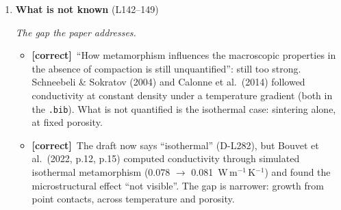 \documentclass[11pt]{article}
\newcommand{\Pg}[3]{\item \textbf{#1} {\small(#2)}\par\textit{#3}}
\newcommand{\tC}{\textcolor{miss}{\textbf{[correct]}}\ }
\newcommand{\tG}{\textcolor{stale}{\textbf{[wording]}}\ }
\newcommand{\add}[1]{\textcolor{revA}{#1}}
\begin{document}
\begin{enumerate}
\begin{itemize}
    effective parameter.'' This is the evidence for the paper's own use of
    an effective $\alpha_c$.
  \item \add{Both Braun bullets are done (D-L279); supported. ``x-ray compute microtomography'': ``X-ray computed microtomography''.}
  \item \tC \textbf{Libbrecht (2017)} is cited as work on DSM and as an
    experiment parameterizing growth with temperature and saturation. It is
    a review of ice crystal growth (snow crystals in clouds, growth from
    liquid and vapor), not metamorphism; drop it from the DSM list. For the
    kinetics sentence cite the measurements, Libbrecht \& Rickerby (2013),
    with the review if wanted.
  \item \add{Resolved for the DSM list (D-L279). In the ``many experiments'' sentence L\&R (2013) is now cited; Colbeck (1983) is a theory paper and can go from it.}
  \item \tC \textbf{Moure \& Fu (2024) is a wet-snow model} (``A Phase-Field
    Model for Wet Snow Metamorphism''); this paper uses its two-phase
    (ice--air) form. Say so, as Section~5 already does.
  \item \tG ``all stages DSM'': ``all stages of DSM''. ``in hopes better
    predict'': ``to better predict''. ``were the first to attempt to use'':
    ``were the first to use''. ``steady state'' (adjective):
    ``steady-state''.
  \end{itemize}
\Pg{What is not known}{L142--149}{The gap the paper addresses.}
  \begin{itemize}
  \item \tC ``How metamorphism influences the macroscopic properties in the
    absence of compaction is still unquantified'': still too strong.
    Schneebeli \& Sokratov (2004) and Calonne et al.\ (2014) followed
    conductivity at constant density under a temperature gradient (both in
    the \texttt{.bib}). What is not quantified is the isothermal case:
    sintering alone, at fixed porosity.
  \item \add{\tC The draft now says ``isothermal'' (D-L282), but Bouvet et al.\ (2022, p.12, p.15) computed conductivity through simulated isothermal metamorphism (0.078 $\to$ 0.081~W\,m$^{-1}$\,K$^{-1}$) and found the microstructural effect ``not visible''. The gap is narrower: growth from point contacts, across temperature and porosity.}

\end{itemize}
\end{enumerate}
\end{document}
